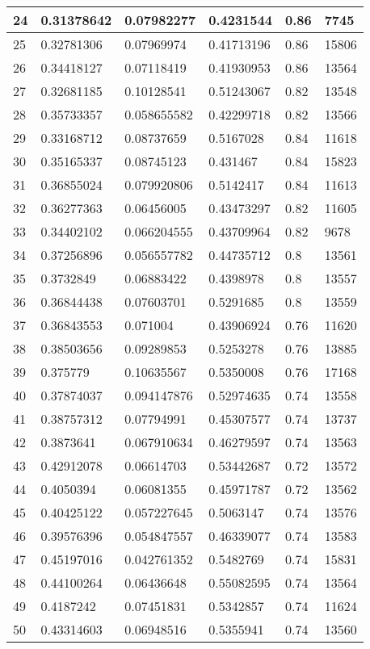 \begin{longtable}{|l|l|l|l|l|l|}
24 & 0.31378642 & 0.07982277 & 0.4231544 & 0.86 & 7745 \\ \hline 
25 & 0.32781306 & 0.07969974 & 0.41713196 & 0.86 & 15806 \\ \hline 
26 & 0.34418127 & 0.07118419 & 0.41930953 & 0.86 & 13564 \\ \hline 
27 & 0.32681185 & 0.10128541 & 0.51243067 & 0.82 & 13548 \\ \hline 
28 & 0.35733357 & 0.058655582 & 0.42299718 & 0.82 & 13566 \\ \hline 
29 & 0.33168712 & 0.08737659 & 0.5167028 & 0.84 & 11618 \\ \hline 
30 & 0.35165337 & 0.08745123 & 0.431467 & 0.84 & 15823 \\ \hline 
31 & 0.36855024 & 0.079920806 & 0.5142417 & 0.84 & 11613 \\ \hline 
32 & 0.36277363 & 0.06456005 & 0.43473297 & 0.82 & 11605 \\ \hline 
33 & 0.34402102 & 0.066204555 & 0.43709964 & 0.82 & 9678 \\ \hline 
34 & 0.37256896 & 0.056557782 & 0.44735712 & 0.8 & 13561 \\ \hline 
35 & 0.3732849 & 0.06883422 & 0.4398978 & 0.8 & 13557 \\ \hline 
36 & 0.36844438 & 0.07603701 & 0.5291685 & 0.8 & 13559 \\ \hline 
37 & 0.36843553 & 0.071004 & 0.43906924 & 0.76 & 11620 \\ \hline 
38 & 0.38503656 & 0.09289853 & 0.5253278 & 0.76 & 13885 \\ \hline 
39 & 0.375779 & 0.10635567 & 0.5350008 & 0.76 & 17168 \\ \hline 
40 & 0.37874037 & 0.094147876 & 0.52974635 & 0.74 & 13558 \\ \hline 
41 & 0.38757312 & 0.07794991 & 0.45307577 & 0.74 & 13737 \\ \hline 
42 & 0.3873641 & 0.067910634 & 0.46279597 & 0.74 & 13563 \\ \hline 
43 & 0.42912078 & 0.06614703 & 0.53442687 & 0.72 & 13572 \\ \hline 
44 & 0.4050394 & 0.06081355 & 0.45971787 & 0.72 & 13562 \\ \hline 
45 & 0.40425122 & 0.057227645 & 0.5063147 & 0.74 & 13576 \\ \hline 
46 & 0.39576396 & 0.054847557 & 0.46339077 & 0.74 & 13583 \\ \hline 
47 & 0.45197016 & 0.042761352 & 0.5482769 & 0.74 & 15831 \\ \hline 
48 & 0.44100264 & 0.06436648 & 0.55082595 & 0.74 & 13564 \\ \hline 
49 & 0.4187242 & 0.07451831 & 0.5342857 & 0.74 & 11624 \\ \hline 
50 & 0.43314603 & 0.06948516 & 0.5355941 & 0.74 & 13560 \\ \hline 
\end{longtable}